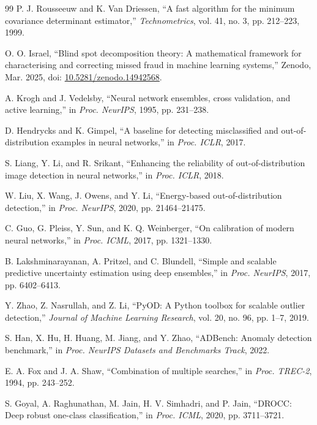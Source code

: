 \documentclass[journal]{IEEEtran}
\begin{document}
\begin{thebibliography}{99}
P. J. Rousseeuw and K. Van Driessen, ``A fast algorithm for the minimum covariance determinant estimator,'' \textit{Technometrics}, vol. 41, no. 3, pp. 212--223, 1999.

O. O. Israel, ``Blind spot decomposition theory: A mathematical framework for characterising and correcting missed fraud in machine learning systems,'' Zenodo, Mar. 2025, doi: \href{https://doi.org/10.5281/zenodo.14942568}{10.5281/zenodo.14942568}.

A. Krogh and J. Vedelsby, ``Neural network ensembles, cross validation, and active learning,'' in \textit{Proc. NeurIPS}, 1995, pp. 231--238.

D. Hendrycks and K. Gimpel, ``A baseline for detecting misclassified and out-of-distribution examples in neural networks,'' in \textit{Proc. ICLR}, 2017.

S. Liang, Y. Li, and R. Srikant, ``Enhancing the reliability of out-of-distribution image detection in neural networks,'' in \textit{Proc. ICLR}, 2018.

W. Liu, X. Wang, J. Owens, and Y. Li, ``Energy-based out-of-distribution detection,'' in \textit{Proc. NeurIPS}, 2020, pp. 21464--21475.

C. Guo, G. Pleiss, Y. Sun, and K. Q. Weinberger, ``On calibration of modern neural networks,'' in \textit{Proc. ICML}, 2017, pp. 1321--1330.

B. Lakshminarayanan, A. Pritzel, and C. Blundell, ``Simple and scalable predictive uncertainty estimation using deep ensembles,'' in \textit{Proc. NeurIPS}, 2017, pp. 6402--6413.

Y. Zhao, Z. Nasrullah, and Z. Li, ``PyOD: A Python toolbox for scalable outlier detection,'' \textit{Journal of Machine Learning Research}, vol. 20, no. 96, pp. 1--7, 2019.

S. Han, X. Hu, H. Huang, M. Jiang, and Y. Zhao, ``ADBench: Anomaly detection benchmark,'' in \textit{Proc. NeurIPS Datasets and Benchmarks Track}, 2022.

E. A. Fox and J. A. Shaw, ``Combination of multiple searches,'' in \textit{Proc. TREC-2}, 1994, pp. 243--252.

S. Goyal, A. Raghunathan, M. Jain, H. V. Simhadri, and P. Jain, ``DROCC: Deep robust one-class classification,'' in \textit{Proc. ICML}, 2020, pp. 3711--3721.


\end{thebibliography}
\end{document}
